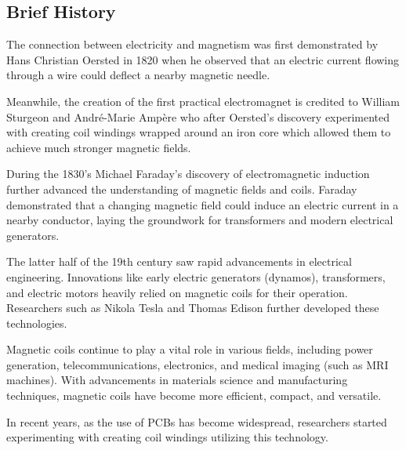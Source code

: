 \subsection{Brief History}

The connection between electricity and magnetism was first demonstrated by Hans Christian Oersted in 1820 when he observed that an electric current flowing through a wire could deflect a nearby magnetic needle.

Meanwhile, the creation of the first practical electromagnet is credited to William Sturgeon and André-Marie Ampère who after Oersted's discovery experimented with creating coil windings wrapped around an iron core which allowed them to achieve much stronger magnetic fields.

During the 1830's Michael Faraday's discovery of electromagnetic induction further advanced the understanding of magnetic fields and coils. Faraday demonstrated that a changing magnetic field could induce an electric current in a nearby conductor, laying the groundwork for transformers and modern electrical generators.

The latter half of the 19th century saw rapid advancements in electrical engineering. Innovations like early electric generators (dynamos), transformers, and electric motors heavily relied on magnetic coils for their operation. Researchers such as Nikola Tesla and Thomas Edison further developed these technologies.

Magnetic coils continue to play a vital role in various fields, including power generation, telecommunications, electronics, and medical imaging (such as MRI machines). With advancements in materials science and manufacturing techniques, magnetic coils have become more efficient, compact, and versatile.

In recent years, as the use of PCBs has become widespread, researchers started experimenting with creating coil windings utilizing this technology.
